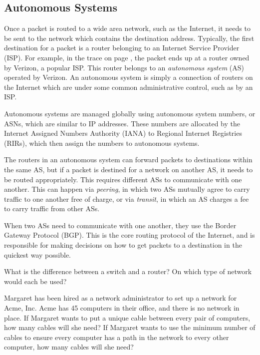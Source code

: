 \subsection{Autonomous Systems}

Once a packet is routed to a wide area network, such as the Internet, it needs to be sent to the network which contains the destination address. Typically, the first destination for a packet is a router belonging to an Internet Service Provider (ISP). For example, in the  trace on page \pageref{code:traceroute}, the packet ends up at a router owned by Verizon, a popular ISP. This router belongs to an \emph{autonomous system} (AS) operated by Verizon. An autonomous system is simply a connection of routers on the Internet which are under some common administrative control, such as by an ISP.

Autonomous systems are managed globally using autonomous system numbers, or ASNs, which are similar to IP addresses. These numbers are allocated by the Internet Assigned Numbers Authority (IANA) to Regional Internet Registries (RIRs), which then assign the numbers to autonomous systems.

The routers in an autonomous system can forward packets to destinations within the same AS, but if a packet is destined for a network on another AS, it needs to be routed appropriately. This requires different ASs to communicate with one another. This can happen via \emph{peering}, in which two ASs mutually agree to carry traffic to one another free of charge, or via \emph{transit}, in which an AS charges a fee to carry traffic from other ASs.

When two ASs need to communicate with one another, they use the Border Gateway Protocol (BGP). This is the core routing protocol of the Internet, and is responsible for making decisions on how to get packets to a destination in the quickest way possible. 

\exercisesection

\begin{exercise}
    What is the difference between a switch and a router? On which type of network would each be used?
\end{exercise}

\begin{exercise}
    Margaret has been hired as a network administrator to set up a network for Acme, Inc. Acme has 45 computers in their office, and there is no network in place. If Margaret wants to put a unique cable between every pair of computers, how many cables will she need? If Margaret wants to use the minimum number of cables to ensure every computer has a path in the network to every other computer, how many cables will she need?
\end{exercise}